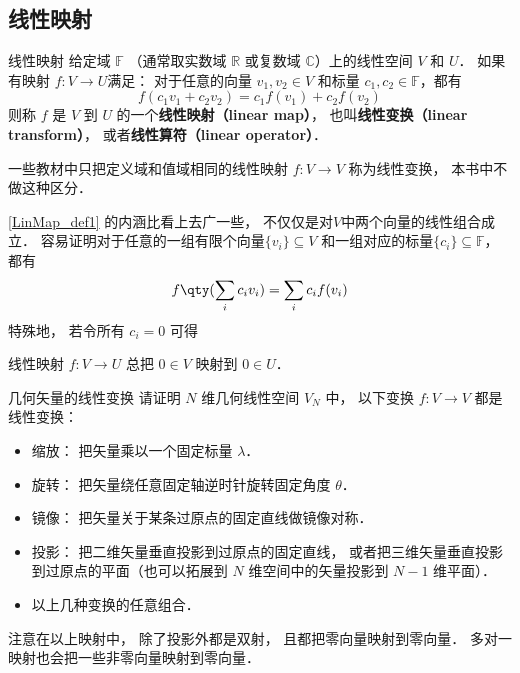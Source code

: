 
\begin{issues}
\end{issues}



\subsection{线性映射}
\begin{definition}{线性映射}\label{LinMap_def1}
给定域 $\mathbb F$ （通常取实数域 $\mathbb R$ 或复数域 $\mathbb C$）上的线性空间 $V$ 和 $U$． 如果有映射 $f:V\rightarrow U$满足： 对于任意的向量 ${v}_1, {v}_2\in V$ 和标量 $c_1, c_2 \in \mathbb{F}$，都有
\begin{equation}
f(c_1 {v}_1+c_2 {v}_2)=c_1f({v}_1)+c_2f({v}_2)
\end{equation}
则称 $f$ 是 $V$ 到 $U$ 的一个\textbf{线性映射（linear map）}， 也叫\textbf{线性变换（linear transform）}， 或者\textbf{线性算符（linear operator）}．
\end{definition}
一些教材中只把定义域和值域相同的线性映射 $f:V\to V$ 称为线性变换， 本书中不做这种区分．

\autoref{LinMap_def1} 的内涵比看上去广一些， 不仅仅是对$V$中两个向量的线性组合成立． 容易证明对于任意的一组有限个向量$\{{v}_i\}\subseteq V$ 和一组对应的标量$\{c_i\}\subseteq\mathbb{F}$，都有
\begin{equation}\label{LinMap_eq1}
f\qty(\sum_i c_i {v}_i)=\sum_i c_i f({v}_i)
\end{equation}
特殊地， 若令所有 $c_i = 0$ 可得
\begin{corollary}{}\label{LinMap_cor1}
线性映射 $f:V\to U$ 总把 $0 \in V$ 映射到 $0 \in U$．
\end{corollary}

\begin{exercise}{几何矢量的线性变换}
请证明 $N$ 维几何线性空间 $V_N$ 中， 以下变换 $f:V\to V$ 都是线性变换：
\begin{itemize}
\item 缩放： 把矢量乘以一个固定标量 $\lambda$．
\item 旋转： 把矢量绕任意固定轴逆时针旋转固定角度 $\theta$．
\item 镜像： 把矢量关于某条过原点的固定直线做镜像对称．
\item 投影： 把二维矢量垂直投影到过原点的固定直线， 或者把三维矢量垂直投影到过原点的平面（也可以拓展到 $N$ 维空间中的矢量投影到 $N-1$ 维平面）．
\item 以上几种变换的任意组合．
\end{itemize}
\end{exercise}
注意在以上映射中， 除了投影外都是双射， 且都把零向量映射到零向量． 多对一映射也会把一些非零向量映射到零向量．

